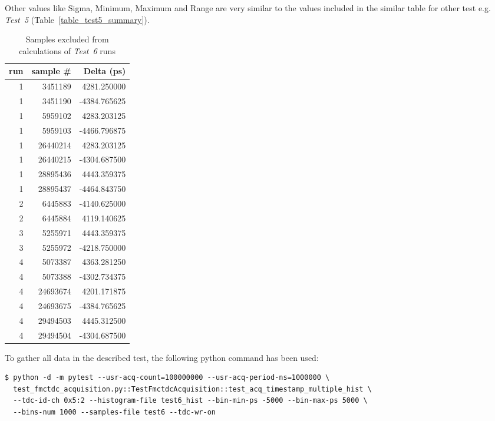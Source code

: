 \documentclass[a4paper, 12pt]{article}
\begin{document}
Other values like Sigma, Minimum, Maximum and Range are very similar to
the values included in the similar table for other test e.g. \textit{Test~5}
(Table~\ref{table_test5_summary}).
\begin{table}[!htb]
\centering
\tiny
  \begin{tabular}{|r|r|r|}
    \hline
    {\bf run } &{\bf sample \#} & {\bf Delta (ps)} \\
    \hline
    1          &  3451189  &  4281.250000 \\
    1          &  3451190  & -4384.765625 \\
    1          &  5959102  &  4283.203125 \\
    1          &  5959103  & -4466.796875 \\
    1          & 26440214  &  4283.203125 \\
    1          & 26440215  & -4304.687500 \\
    1          & 28895436  &  4443.359375 \\
    1          & 28895437  & -4464.843750 \\
    2          &  6445883  & -4140.625000 \\
    2          &  6445884  &  4119.140625 \\
    3          &  5255971  &  4443.359375 \\
    3          &  5255972  & -4218.750000 \\
    4          &  5073387  &  4363.281250 \\
    4          &  5073388  & -4302.734375 \\
    4          & 24693674  &  4201.171875 \\
    4          & 24693675  & -4384.765625 \\
    4          & 29494503  &  4445.312500 \\
    4          & 29494504  & -4304.687500 \\
    \hline
  \end{tabular}
  \caption{Samples excluded from calculations of \textit{Test~6} runs}
  \label{table_test6_samples_excluded}
\end{table}

To gather all data in the described test, the following python command has been
used:
\begin{lstlisting}
$ python -d -m pytest --usr-acq-count=100000000 --usr-acq-period-ns=1000000 \
  test_fmctdc_acquisition.py::TestFmctdcAcquisition::test_acq_timestamp_multiple_hist \
  --tdc-id-ch 0x5:2 --histogram-file test6_hist --bin-min-ps -5000 --bin-max-ps 5000 \
  --bins-num 1000 --samples-file test6 --tdc-wr-on
\end{lstlisting}
\end{document}
